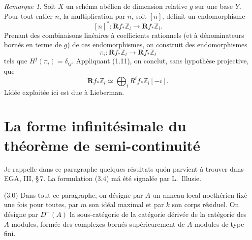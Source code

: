 \documentclass[12pt]{amsart}
\theoremstyle{plain}
\theoremstyle{remark}
\newtheorem{rem}[prop]{Remarque}
\newcommand{\Rf}{\mathbf{R}f_*}
\newcommand{\dm}{D^-}
\begin{document}
\begin{rem}\label{rem:2.19}
Soit $X$ un sch\'ema ab\'elien de dimension relative $g$ sur une base $Y$. Pour tout entier $n$, la multiplication par $n$, soit $[n]$, d\'efinit un endomorphisme
\[
[n]^* : \Rf\mathbb{Z}_l \longrightarrow \Rf\mathbb{Z}_l.
\]
Prenant des combinaisons lin\'eaires \`a coefficients rationnels (et \`a d\'enominateurs born\'es en terme de $g$) de ces endomorphismes, on construit des endomorphismes
\[
\pi_i : \Rf\mathbb{Z}_l \longrightarrow \Rf\mathbb{Z}_l
\]
tels que $H^j(\pi_i) = \delta_{ij}$. Appliquant (1.11), on conclut, sans hypoth\`ese projective, que
\[
\Rf\mathbb{Z}_l \simeq \bigoplus_i R^if_*\mathbb{Z}_l[-i].
\]
L\'id\'ee exploit\'ee ici est due \`a Lieberman.
\end{rem}

\section{La forme infinit\'esimale du th\'eor\`eme de semi-continuit\'e}

Je rappelle dans ce paragraphe quelques r\'esultats qu\'on parvient \`a trouver dans EGA, III, \S\,7. La formulation (3.4) m\'a \'et\'e signal\'ee par L.~Illusie.

(3.0) Dans tout ce paragraphe, on d\'esigne par $A$ un anneau local noeth\'erien fix\'e une fois pour toutes, par $m$ son id\'eal maximal et par $k$ son corps r\'esiduel. On d\'esigne par $\dm(A)$ la sous-cat\'egorie de la cat\'egorie d\'eriv\'ee de la cat\'egorie des $A$-modules, form\'ee des complexes born\'es sup\'erieurement de $A$-modules de type fini.
\end{document}
